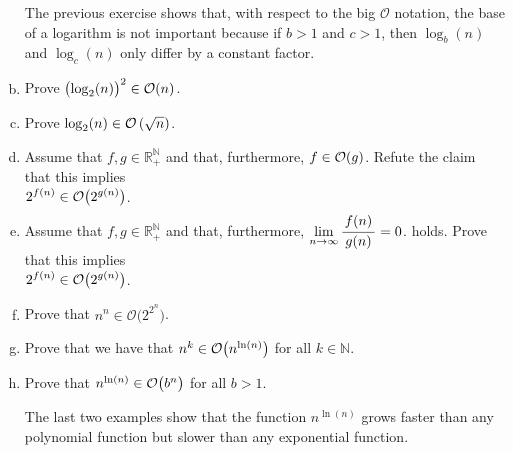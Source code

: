 \begin{enumerate}[(a)]
      \remark
      The previous exercise shows that, with respect to the big $\mathcal{O}$ notation, the base of
      a logarithm is not important because if $b > 1$ and $c > 1$, then $\log_{b}(n)$ and $ \log_{c}(n)$
      only differ by a constant factor.
\item Prove $\bigl(\log_2(n)\bigr)^2 \in \mathcal{O}(n)$.
\item Prove  $\log_2(n) \in \mathcal{O}\left(\sqrt{n}\right)$.
\item Assume that $f, g \in \mathbb{R}_+^\mathbb{N}$ and that, furthermore, $f \in \mathcal{O}(g)$.  
      Refute the claim that this implies 
      \\[0.2cm]
      \hspace*{1.3cm}
      $\displaystyle 2^{f(n)} \in \mathcal{O}\bigl(2^{g(n)}\bigr)$.
\item Assume that $f, g \in \mathbb{R}_+^\mathbb{N}$ and that, furthermore, 
      $\lim\limits_{n \rightarrow \infty} \bruch{f(n)}{g(n)} = 0$.  
      holds.
      Prove that this implies
      \\[0.2cm]
      \hspace*{1.3cm}
      $\displaystyle 2^{f(n)} \in \mathcal{O}\bigl(2^{g(n)}\bigr)$.
\item Prove that $n^n \in \mathcal{O}\bigl(2^{2^n}\bigr)$.
      \eox
\item Prove that we have that $n^k \in \mathcal{O}\bigl(n^{\ln(n)}\bigr)$ for all $k \in \mathbb{N}$. \eox
\item Prove that $n^{\ln(n)} \in \mathcal{O}\bigl(b^n\bigr)$ for all $b > 1$.  \eox

      \remark
      The last two examples show that the function $n^{\ln(n)}$ grows faster than any polynomial function but
      slower than any exponential function.
\end{enumerate}

